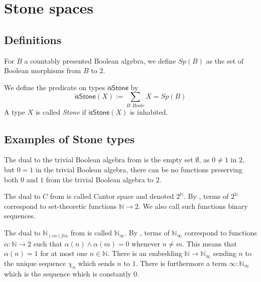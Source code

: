 \documentclass{../util/zariski-small}
\begin{document}
\section{Stone spaces}
\newcommand{\isSt}{\mathsf{isStone}}
\subsection{Definitions}
\begin{definition}
  For $B$ a countably presented Boolean algebra, we define $Sp(B)$ as the set of Boolean morphisms from $B$ to $2$. 
\end{definition}
\begin{definition}
  We define the predicate on types $\isSt$ by 
  \begin{equation}
    \isSt(X) := \sum\limits_{B : Boole} X = Sp(B)
  \end{equation} 
  A type $X$ is called \textit{Stone} if $\isSt(X)$ is inhabited.
\end{definition}
\subsection{Examples of Stone types}
\begin{example}\label{ExampleBAunderEmpty}
  The dual to the trivial Boolean algebra from  is the empty set 
  $\emptyset$, 
  as $0\neq 1$ in $2$, but $0=1$ in the trivial Boolean algebra, 
  there can be no functions preserving both $0$ and $1$ 
  from the trivial Boolean algebra to $2$. 
\end{example}
\begin{example}
  The dual to $C$ from  is called Cantor space 
  and denoted $2^\mathbb N$. 
  By , terms of $2^\mathbb N$ 
  correspond to set-theoretic functions $\mathbb N \to 2$. 
  We also call such functions binary sequences. 
\end{example}
\begin{example}
  The dual to $\mathbb N_{(co)fin}$ from  is called 
  $\mathbb N_\infty$. By , terms of $\mathbb N_\infty$ 
  correspond to functions $\alpha: \mathbb N \to 2$ such that $\alpha(n) \wedge \alpha(m) = 0$ 
  whenever $n \neq m$. This means that $\alpha(n) = 1$ for at most one $n\in\mathbb N$. 
  There is an embedding $\mathbb N \to \mathbb N_\infty$ sending $n$ to the unique sequence $\chi_n$
  which sends $n$ to $1$. 
  There is furthermore a term $\infty:\mathbb N_\infty$ which is the sequence which is constantly $0$. 
\end{example}
\end{document}
